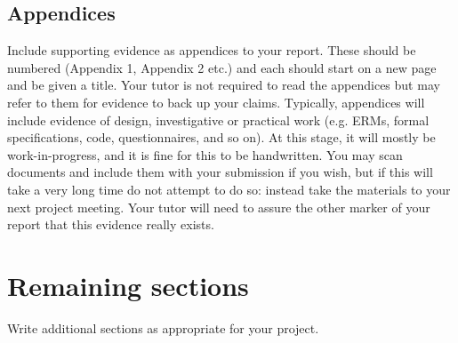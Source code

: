 \documentclass[a4paper, notitlepage, 11pt]{article}
\begin{document}
\subsection{Appendices}

Include supporting evidence as appendices to your report. These should be numbered (Appendix 1, Appendix 2 etc.) and each should start on a new page and be given a title. Your tutor is not required to read the appendices but may refer to them for evidence to back up your claims. Typically, appendices will include evidence of design, investigative or practical work (e.g. ERMs, formal specifications, code, questionnaires, and so on). At this stage, it will mostly be work-in-progress, and it is fine for this to be handwritten. You may scan documents and include them with your submission if you wish, but if this will take a very long time do not attempt to do so: instead take the materials to your next project meeting. Your tutor will need to assure the other marker of your report that this evidence really exists.

\section{Remaining sections}
Write additional sections as appropriate for your project.







\clearpage
\appendix 
{}

\end{document}
